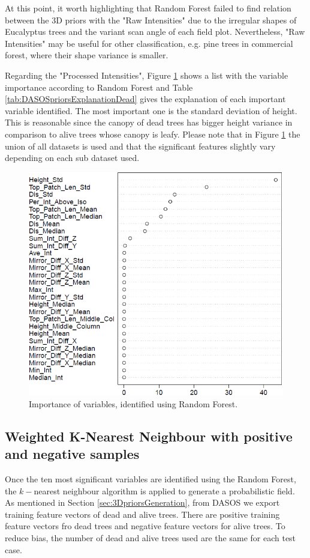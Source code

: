 \documentclass{subfiles}
\begin{document}
	
	\par At this point, it worth highlighting that Random Forest failed to find relation between the 3D priors with the "Raw Intensities" due to the irregular shapes of Eucalyptus trees and the variant scan angle of each field plot. Nevertheless, "Raw Intensities" may be useful for other classification, e.g. pine trees in commercial forest, where their shape variance is smaller.
	
	\par Regarding the "Processed Intensities", Figure \ref{fig:c0_RandomForest} shows a list with the variable importance according to Random Forest and Table \ref{tab:DASOSpriorsExplanationDead} gives the explanation of each important variable identified. The most important one is the standard deviation of height. This is reasonable since the canopy of dead trees has bigger height variance in comparison to alive trees whose canopy is leafy. Please note that in Figure \ref{fig:c0_RandomForest} the union of all datasets is used and that the significant features slightly vary depending on each sub dataset used.  
	
		\begin{figure} [h!]			
				\centering
				\includegraphics[width=.49\textwidth]{img/dead/c0_random_forest}
				\caption{Importance of variables, identified using Random Forest.}
				\label{fig:c0_RandomForest}
		\end{figure}
		

	
	
	
\subsection{Weighted K-Nearest Neighbour with positive and negative samples}


\par Once the ten most significant variables are identified using the Random Forest, the $k-$nearest neighbour algorithm is applied to generate a probabilistic field. As mentioned in Section \ref{sec:3DpriorsGeneration}, from DASOS we export training feature vectors of dead and alive trees. There are positive training feature vectors fro dead trees and negative feature vectors for alive trees. To reduce bias, the number of dead and alive trees used are the same for each test case. 
\end{document}
